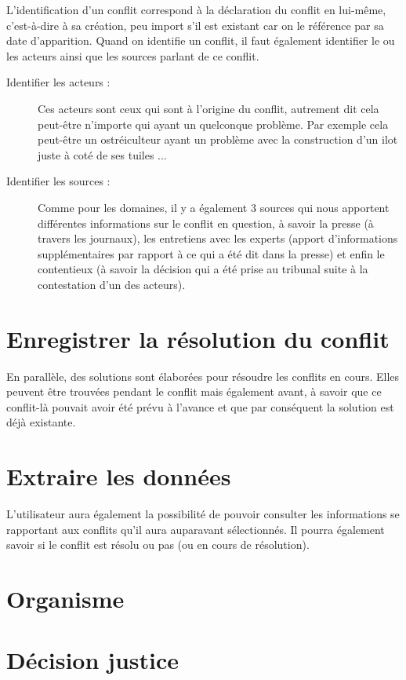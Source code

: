 \documentclass[12pt,a4paper]{article}
\newcommand{\sommaire}{\shorttoc{Sommaire}{2}}
\begin{document}
L'identification d'un conflit correspond à la déclaration du conflit en lui-même, c'est-à-dire à sa création, peu import s'il est existant car on le référence par sa date d'apparition.
Quand on identifie un conflit, il faut également identifier le ou les acteurs ainsi que les sources parlant de ce conflit.

\begin{description}
\item[Identifier les acteurs :] Ces acteurs sont ceux qui sont à l'origine du conflit, autrement dit cela peut-être n'importe qui ayant un quelconque problème. Par exemple cela peut-être un ostréiculteur ayant un problème avec la construction d'un ilot juste à coté de ses tuiles ...
\item[Identifier les sources :] Comme pour les domaines, il y a également 3 sources qui nous apportent différentes informations sur le conflit en question, à savoir la presse (à travers les journaux), les entretiens avec les experts (apport d'informations supplémentaires par rapport à ce qui a été dit dans la presse) et enfin le contentieux (à savoir la décision qui a été prise au tribunal suite à la contestation d'un des acteurs).
\end{description}

\section{Enregistrer la résolution du conflit}
En parallèle, des solutions sont élaborées pour résoudre les conflits en cours. Elles peuvent être trouvées pendant le conflit mais également avant, à savoir que ce conflit-là pouvait avoir été prévu à l'avance et que par conséquent la solution est déjà existante.

\section{Extraire les données}
L'utilisateur aura également la possibilité de pouvoir consulter les informations se rapportant aux conflits qu'il aura auparavant sélectionnés. Il pourra également savoir si le conflit est résolu ou pas (ou en cours de résolution).

\section{Organisme}

\section{Décision justice}


\end{document}
